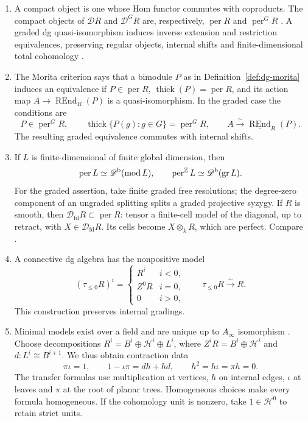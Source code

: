 \documentclass[12pt,a4paper,english,reqno]{amsart}
\theoremstyle{plain}
\theoremstyle{definition}
\numberwithin{equation}{section}
\def\io{\iota}
\def\ta{\tau}
\def\thick{\operatorname{thick}}
\def\Db{{\mathcal D}^{\text{\rm b}}}
\def\perf{\operatorname{per}}
\def\calD{{\mathcal D}}
\def\bbZ{{\mathbb Z}}
\def\iso{\cong}
\def\ds{\oplus}
\def\ox{\otimes}
\def\ya#1{\xrightarrow{#1}}
\def\REnd{\operatorname{REnd}}
\def\gr{\operatorname{gr}}
\def\Ainf{A_\infty}
\def\fd{\mathrm{fd}}
\newcommand{\uREnd}{\underline{\REnd}}
\begin{document}
\begin{enumerate}[label=(\roman*)]
\item A compact object is one whose Hom functor commutes with
coproducts. The compact objects of $\calD R$ and $\calD^G R$ are,
respectively, $\perf R$ and $\perf^G R$
\cite[Theorem 3.4 and Corollary 3.7]{KellerDG}. A graded dg
quasi-isomorphism induces inverse extension and restriction
equivalences, preserving regular objects, internal shifts and
finite-dimensional total cohomology \cite[Section 3.8]{KellerDG}.

\item The Morita criterion \cite[Lemma 3.10]{KellerDG} says that a
bimodule $P$ as in Definition~\ref{def:dg-morita} induces an equivalence
if $P\in\perf R$, $\thick(P)=\perf R$, and its action map
$A\to\REnd_R(P)$ is a quasi-isomorphism. In the graded case the
conditions are
\[
 P\in\perf^G R,\qquad
 \thick\{P(g):g\in G\}=\perf^G R,\qquad
 A\ya{\sim}\uREnd_R(P).
\]
The resulting graded equivalence commutes with internal shifts.

\item If $L$ is finite-dimensional of finite global dimension, then
\[
 \perf L\simeq\Db(\operatorname{mod}L),\qquad
 \perf^{\bbZ}L\simeq\Db(\gr L).
\]
For the graded assertion, take finite graded free resolutions; the
degree-zero component of an ungraded splitting splits a graded
projective syzygy. If $R$ is smooth, then
$\calD_{\fd}R\subset\perf R$: tensor a finite-cell model of the
diagonal, up to retract, with $X\in\calD_{\fd}R$. Its cells become
$X\ox_kR$, which are perfect. Compare
\cite[Section 2, before Theorem 2.1]{Amiot}.

\item A connective dg algebra has the nonpositive model
\[
 (\ta_{\le0}R)^i=
 \begin{cases}R^i&i<0,\\Z^0R&i=0,\\0&i>0,\end{cases}
 \qquad \ta_{\le0}R\ya{\sim}R.
\]
This construction preserves internal gradings.

\item Minimal models exist over a field and are unique up to
$\Ainf$ isomorphism \cite[Sections 3.3 and 8.1]{KellerAinf}.
Choose decompositions $R^i=B^i\ds\mathcal H^i\ds L^i$, where
$Z^iR=B^i\ds\mathcal H^i$ and $d:L^i\iso B^{i+1}$.
We thus obtain contraction data
\[
 \pi\io=1,\qquad 1-\io\pi=dh+hd,\qquad
 h^2=h\io=\pi h=0.
\]
The transfer formulas use multiplication at vertices, $h$ on internal
edges, $\io$ at leaves and $\pi$ at the root of planar trees.
Homogeneous choices make every formula homogeneous. If the cohomology
unit is nonzero, take $1\in\mathcal H^0$ to retain strict units.


\end{enumerate}
\end{document}
